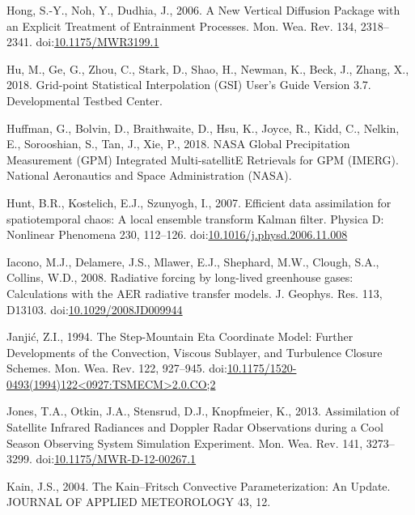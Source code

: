 \documentclass[final,5p,times,twocolumn,authoryear]{elsarticle} %
\begin{document}
\leavevmode\hypertarget{ref-hong2006}{}%
Hong, S.-Y., Noh, Y., Dudhia, J., 2006. A New Vertical Diffusion Package with an Explicit Treatment of Entrainment Processes. Mon. Wea. Rev. 134, 2318--2341. doi:\href{https://doi.org/10.1175/MWR3199.1}{10.1175/MWR3199.1}

\leavevmode\hypertarget{ref-hu2018}{}%
Hu, M., Ge, G., Zhou, C., Stark, D., Shao, H., Newman, K., Beck, J., Zhang, X., 2018. Grid-point Statistical Interpolation (GSI) User's Guide Version 3.7. Developmental Testbed Center.

\leavevmode\hypertarget{ref-huffman2018}{}%
Huffman, G., Bolvin, D., Braithwaite, D., Hsu, K., Joyce, R., Kidd, C., Nelkin, E., Sorooshian, S., Tan, J., Xie, P., 2018. NASA Global Precipitation Measurement (GPM) Integrated Multi-satellitE Retrievals for GPM (IMERG). National Aeronautics and Space Administration (NASA).

\leavevmode\hypertarget{ref-hunt2007}{}%
Hunt, B.R., Kostelich, E.J., Szunyogh, I., 2007. Efficient data assimilation for spatiotemporal chaos: A local ensemble transform Kalman filter. Physica D: Nonlinear Phenomena 230, 112--126. doi:\href{https://doi.org/10.1016/j.physd.2006.11.008}{10.1016/j.physd.2006.11.008}

\leavevmode\hypertarget{ref-iacono2008}{}%
Iacono, M.J., Delamere, J.S., Mlawer, E.J., Shephard, M.W., Clough, S.A., Collins, W.D., 2008. Radiative forcing by long-lived greenhouse gases: Calculations with the AER radiative transfer models. J. Geophys. Res. 113, D13103. doi:\href{https://doi.org/10.1029/2008JD009944}{10.1029/2008JD009944}

\leavevmode\hypertarget{ref-janjic1994}{}%
Janjić, Z.I., 1994. The Step-Mountain Eta Coordinate Model: Further Developments of the Convection, Viscous Sublayer, and Turbulence Closure Schemes. Mon. Wea. Rev. 122, 927--945. doi:\href{https://doi.org/10.1175/1520-0493(1994)122\%3C0927:TSMECM\%3E2.0.CO;2}{10.1175/1520-0493(1994)122\textless0927:TSMECM\textgreater2.0.CO;2}

\leavevmode\hypertarget{ref-jones2013}{}%
Jones, T.A., Otkin, J.A., Stensrud, D.J., Knopfmeier, K., 2013. Assimilation of Satellite Infrared Radiances and Doppler Radar Observations during a Cool Season Observing System Simulation Experiment. Mon. Wea. Rev. 141, 3273--3299. doi:\href{https://doi.org/10.1175/MWR-D-12-00267.1}{10.1175/MWR-D-12-00267.1}

\leavevmode\hypertarget{ref-kain2004}{}%
Kain, J.S., 2004. The Kain--Fritsch Convective Parameterization: An Update. JOURNAL OF APPLIED METEOROLOGY 43, 12.
\end{document}
